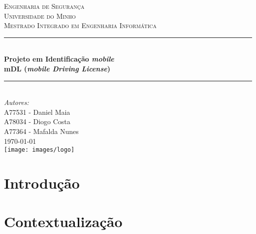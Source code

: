 \documentclass[11pt]{article}
\begin{document}
\sloppy

\begin{titlepage}

\newcommand{\HRule}{\rule{\linewidth}{0.5mm}}

\center %
 
\textsc{\LARGE Engenharia de Segurança}\\[1.5cm]
\textsc{\Large Universidade do Minho}\\[0.5cm]
\textsc{\large Mestrado Integrado em Engenharia Informática}\\[0.6cm]

\vspace{0.8cm}
\HRule \\[0.6cm]
{ \huge \bfseries Projeto em Identificação \textit{mobile}}\\[0.4cm]
{ \Large \bfseries \textbf{mDL} (\textit{mobile Driving License})} \\[0.4cm]
\HRule \\[1.2cm]

\Large \emph{Autores:}\\
A77531 - Daniel Maia\\
A78034 - Diogo Costa\\
A77364 - Mafalda Nunes\\[1.3cm]

{\large \today}\\[1.5cm]

\texttt{[image: images/logo]}\\[1cm]

\vfill %

\end{titlepage}


\begin{abstract}
\end{abstract}

\vspace{0.8cm}

\tableofcontents

\newpage

\section{Introdução}


\section{Contextualização}

\end{document}
